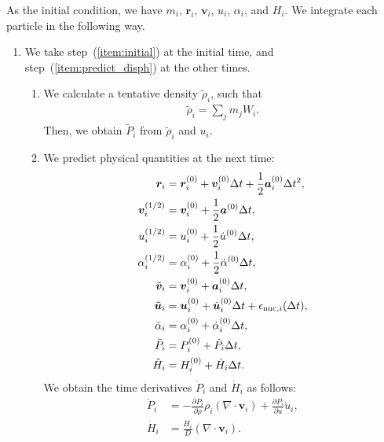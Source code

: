 \documentclass[fleqn,dvipdfmx]{article}
\begin{document}
As the initial condition, we have $m_i$, $\bm{r}_i$, $\bm{v}_i$,
$u_i$, $\alpha_i$, and $H_i$. We integrate each particle in the
following way.
\begin{enumerate}

\item We take step~(\ref{item:initial}) at the initial time, and
  step~(\ref{item:predict_disph}) at the other times.

  \begin{enumerate}
  \item \label{item:initial} We calculate a tentative density
    $\tilde{\rho}_i$, such that
    \begin{align}
      \tilde{\rho}_i = \sum_j m_j W_i.
    \end{align}
    Then, we obtain $\tilde{P}_i$ from $\tilde{\rho}_i$ and $u_i$.

  \item \label{item:predict_disph} We predict physical quantities at
    the next time:
    \begin{align}
      \bm{r}_{i} &= \bm{r}^{(0)}_i + \bm{v}^{(0)}_i \Delta t +
      \frac{1}{2} \bm{a}^{(0)}_i \Delta t^2, \\
      \bm{v}^{(1/2)}_i &= \bm{v}^{(0)}_i + \frac{1}{2} \bm{a}^{(0)}
      \Delta t, \\
      u^{(1/2)}_i &= u^{(0)}_i + \frac{1}{2} \dot{u}^{(0)} \Delta t, \\
      \alpha^{(1/2)}_i &= \alpha^{(0)}_i + \frac{1}{2}
      \dot{\alpha}^{(0)} \Delta t, \\
      \tilde{\bm{v}}_{i} &= \bm{v}^{(0)}_i + \bm{a}^{(0)}_i \Delta t, \\
      \tilde{\bm{u}}_{i} &= \bm{u}^{(0)}_i + \dot{\bm{u}}^{(0)}_i \Delta
      t + \epsilon_{{\rm nuc},i}(\Delta t), \\
      \tilde{\alpha}_i &= \alpha^{(0)}_i + \dot{\alpha}^{(0)}_i \Delta
      t, \\
      \tilde{P}_i &= P^{(0)}_i + \dot{P}_i \Delta t, \\
      \tilde{H}_i &= H^{(0)}_i + \dot{H}_i \Delta t.
    \end{align}
    We obtain the time derivatives $\dot{P}_i$ and $\dot{H}_i$ as follows:
    \begin{align}
      \dot{P}_i &= - \frac{\partial P_i}{\partial \rho} \rho_i (
      \nabla \cdot \bm{v}_i) + \frac{\partial P_i}{\partial u}
      \dot{u}_i, \\
      \dot{H}_i &= \frac{H_i}{D} (\nabla \cdot \bm{v}_i).
    \end{align}
  \end{enumerate}


\end{enumerate}
\end{document}

